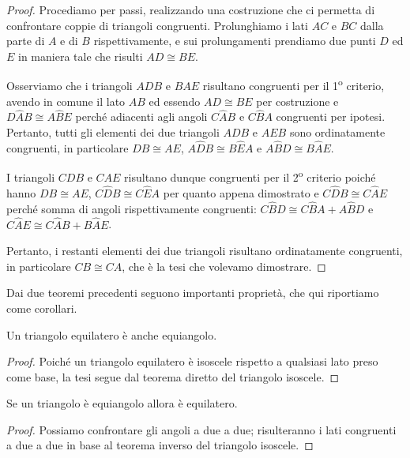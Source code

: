 \begin{proof}
Procediamo per passi, realizzando una costruzione che ci permetta di 
confrontare coppie di triangoli congruenti. Prolunghiamo i lati \(AC\) 
e \(BC\) dalla parte di \(A\) e di \(B\) rispettivamente, e sui 
prolungamenti prendiamo due punti \(D\) ed \(E\) in maniera tale che 
risulti \(AD\cong BE\).

Osserviamo che i triangoli \(ADB\) e \(BAE\) risultano congruenti per il 
1\textsuperscript{o} criterio, avendo in comune il lato \(AB\) ed 
essendo \(AD\cong BE\) per costruzione e \(D\widehat{A}B\cong 
A\widehat{B}E\) perché adiacenti agli angoli \(C\widehat{A}B\) e 
\(C\widehat{B}A\) congruenti per ipotesi. Pertanto, tutti gli elementi 
dei due triangoli \(ADB\) e \(AEB\) sono ordinatamente congruenti, in 
particolare \(DB\cong AE\), \(A\widehat{D}B\cong B\widehat{E}A\) e 
\(A\widehat{B}D\cong B\widehat{A}E\).

I triangoli \(CDB\) e \(CAE\) risultano dunque congruenti per il 
2\textsuperscript{o} criterio poiché hanno \(DB\cong AE\), 
\(C\widehat{D}B\cong C\widehat{E}A\) per quanto appena dimostrato e 
\(C\widehat{D}B\cong C\widehat{A}E\) perché somma di angoli 
rispettivamente congruenti: \(C\widehat{B}D\cong C\widehat{B}A + 
A\widehat{B}D\) e \(C\widehat{A}E\cong C\widehat{A}B + B\widehat{A}E\).

Pertanto, i restanti elementi dei due triangoli risultano 
ordinatamente congruenti, in particolare \(CB\cong CA\), che è la tesi 
che volevamo dimostrare.
\end{proof}


Dai due teoremi precedenti seguono importanti proprietà, che qui 
riportiamo come corollari.

\begin{corollario}
Un triangolo equilatero è anche equiangolo.
\end{corollario}

\begin{proof}
Poiché un triangolo equilatero è isoscele rispetto a qualsiasi lato 
preso come base, la tesi segue dal teorema diretto del triangolo 
isoscele.
\end{proof}

\begin{corollario}
Se un triangolo è equiangolo allora è equilatero.
\end{corollario}

\begin{proof}
Possiamo confrontare gli angoli a due a due; risulteranno i lati 
congruenti a due a due in base al teorema inverso del triangolo 
isoscele.
\end{proof}

